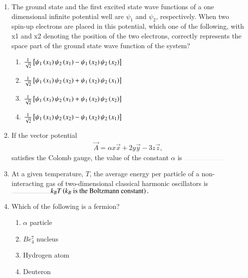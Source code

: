\documentclass[journal,12pt,onecolumn]{IEEEtran}
\theoremstyle{remark}
\begin{document}
\begin{enumerate}[start=14]
\item The ground state and the first excited state wave functions of a one dimensional infinite potential well are $\psi_1$ and $\psi_2$, respectively. When two spin-up electrons are placed in this potential, which one of the following, with x1 and x2 denoting the position of the two electrons, correctly represents the space part of the ground state wave function of the system?
\hfill{}
\begin{enumerate}
\item $\frac{1}{\sqrt{2}}{}\left[\psi_1\left(x_1\right)\psi_2\left(x_1\right) - \psi_1\left(x_2\right)\psi_2\left(x_2\right)\right]$
\item $\frac{1}{\sqrt{2}}{}\left[\psi_1\left(x_1\right)\psi_2\left(x_2\right) + \psi_1\left(x_2\right)\psi_2\left(x_1\right)\right]$
\item $\frac{1}{\sqrt{2}}{}\left[\psi_1\left(x_1\right)\psi_2\left(x_1\right) + \psi_1\left(x_2\right)\psi_2\left(x_2\right)\right]$
\item $\frac{1}{\sqrt{2}}{}\left[\psi_1\left(x_1\right)\psi_2\left(x_2\right) - \psi_1\left(x_2\right)\psi_2\left(x_1\right)\right]$
\end{enumerate}

\item If the vector potential
\begin{align*}
\vec{A} = \alpha x\vec{x} + 2y\vec{y} - 3z\vec{z},
\end{align*}
satisfies the Colomb gauge, the value of the constant $\alpha$ is $\rule{2cm}{0.1pt}$
\hfill{}

\item At a given temperature, $T$, the average energy per particle of a non-interacting gas of two-dimensional classical harmonic oscillators is $\rule{2cm}{0.1pt} k_{B}T\brak{k_B \text{ is the Boltzmann constant}}.$
\hfill{}

\item Which of the following is a fermion?
\hfill{}
\begin{enumerate}
\item $\alpha$ particle
\item $Be_{4}^{7}$ nucleus
\item Hydrogen atom
\item Deuteron
\end{enumerate}


\end{enumerate}
\end{document}
